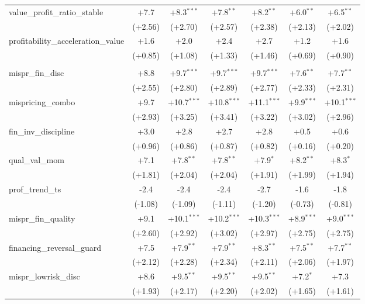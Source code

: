 \begin{table}[htbp]
\begin{threeparttable}
\begin{tabular}{lcccccc}
\addlinespace
value\_profit\_ratio\_stable & +7.7 & +8.3$^{***}$ & +7.8$^{**}$ & +8.2$^{**}$ & +6.0$^{**}$ & +6.5$^{**}$ \\
 & (+2.56) & (+2.70) & (+2.57) & (+2.38) & (+2.13) & (+2.02) \\
\addlinespace
profitability\_acceleration\_value & +1.6 & +2.0 & +2.4 & +2.7 & +1.2 & +1.6 \\
 & (+0.85) & (+1.08) & (+1.33) & (+1.46) & (+0.69) & (+0.90) \\
\addlinespace
\midrule
\multicolumn{7}{l}{\textit{Panel B: Out-of-sample (post-2000-12-31)}} \\
\addlinespace
mispr\_fin\_disc & +8.8 & +9.7$^{***}$ & +9.7$^{***}$ & +9.7$^{***}$ & +7.6$^{**}$ & +7.7$^{**}$ \\
 & (+2.55) & (+2.80) & (+2.89) & (+2.77) & (+2.33) & (+2.31) \\
\addlinespace
mispricing\_combo & +9.7 & +10.7$^{***}$ & +10.8$^{***}$ & +11.1$^{***}$ & +9.9$^{***}$ & +10.1$^{***}$ \\
 & (+2.93) & (+3.25) & (+3.41) & (+3.22) & (+3.02) & (+2.96) \\
\addlinespace
fin\_inv\_discipline & +3.0 & +2.8 & +2.7 & +2.8 & +0.5 & +0.6 \\
 & (+0.96) & (+0.86) & (+0.87) & (+0.82) & (+0.16) & (+0.20) \\
\addlinespace
qual\_val\_mom & +7.1 & +7.8$^{**}$ & +7.8$^{**}$ & +7.9$^{*}$ & +8.2$^{**}$ & +8.3$^{*}$ \\
 & (+1.81) & (+2.04) & (+2.04) & (+1.91) & (+1.99) & (+1.94) \\
\addlinespace
prof\_trend\_ts & -2.4 & -2.4 & -2.4 & -2.7 & -1.6 & -1.8 \\
 & (-1.08) & (-1.09) & (-1.11) & (-1.20) & (-0.73) & (-0.81) \\
\addlinespace
mispr\_fin\_quality & +9.1 & +10.1$^{***}$ & +10.2$^{***}$ & +10.3$^{***}$ & +8.9$^{***}$ & +9.0$^{***}$ \\
 & (+2.60) & (+2.92) & (+3.02) & (+2.97) & (+2.75) & (+2.75) \\
\addlinespace
financing\_reversal\_guard & +7.5 & +7.9$^{**}$ & +7.9$^{**}$ & +8.3$^{**}$ & +7.5$^{**}$ & +7.7$^{**}$ \\
 & (+2.12) & (+2.28) & (+2.34) & (+2.11) & (+2.06) & (+1.97) \\
\addlinespace
mispr\_lowrisk\_disc & +8.6 & +9.5$^{**}$ & +9.5$^{**}$ & +9.5$^{**}$ & +7.2$^{*}$ & +7.3 \\
 & (+1.93) & (+2.17) & (+2.20) & (+2.02) & (+1.65) & (+1.61) \\

\end{tabular}
\end{threeparttable}
\end{table}
